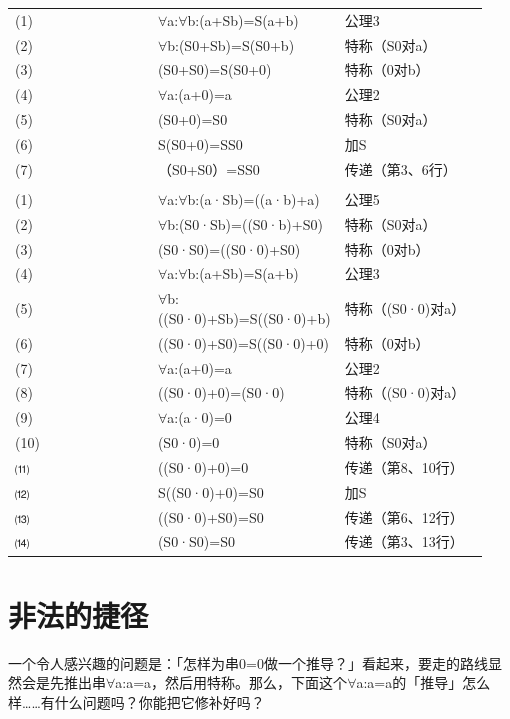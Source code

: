 \documentclass[
  12pt,
  twoside,
  openright,
  oldfontcommands,
]{memoir}
\begin{document}
\begin{longtable}[]{>{\raggedright\arraybackslash}p{0.313\linewidth} >{\raggedright\arraybackslash}p{0.313\linewidth} >{\raggedright\arraybackslash}p{0.313\linewidth}}
\toprule\noalign{}
\endhead
\bottomrule\noalign{}
\endlastfoot
(1) & $\forall$a:$\forall$b:(a+Sb)=S(a+b) & 公理3 \\
(2) & $\forall$b:(S0+Sb)=S(S0+b) & 特称（S0对a） \\
(3) & (S0+S0)=S(S0+0) & 特称（0对b） \\
(4) & $\forall$a:(a+0)=a & 公理2 \\
(5) & (S0+0)=S0 & 特称（S0对a） \\
(6) & S(S0+0)=SS0 & 加S \\
(7) & （S0+S0）=SS0 & 传递（第3、6行） \\
\multicolumn{3}{@{}l@{}}{%
*　*　*　*　*} \\
(1) & $\forall$a:$\forall$b:(a·Sb)=((a·b)+a) & 公理5 \\
(2) & $\forall$b:(S0·Sb)=((S0·b)+S0) & 特称（S0对a） \\
(3) & (S0·S0)=((S0·0)+S0) & 特称（0对b） \\
(4) & $\forall$a:$\forall$b:(a+Sb)=S(a+b) & 公理3 \\
(5) & $\forall$b:((S0·0)+Sb)=S((S0·0)+b) & 特称（(S0·0)对a） \\
(6) & ((S0·0)+S0)=S((S0·0)+0) & 特称（0对b） \\
(7) & $\forall$a:(a+0)=a & 公理2 \\
(8) & ((S0·0)+0)=(S0·0) & 特称（(S0·0)对a） \\
(9) & $\forall$a:(a·0)=0 & 公理4 \\
(10) & (S0·0)=0 & 特称（S0对a） \\
⑾ & ((S0·0)+0)=0 & 传递（第8、10行） \\
⑿ & S((S0·0)+0)=S0 & 加S \\
⒀ & ((S0·0)+S0)=S0 & 传递（第6、12行） \\
⒁ & (S0·S0)=S0 & 传递（第3、13行） \\
\end{longtable}

\section{非法的捷径}

一个令人感兴趣的问题是：「怎样为串0=0做一个推导？」看起来，要走的路线显然会是先推出串$\forall$a:a=a，然后用特称。那么，下面这个$\forall$a:a=a的「推导」怎么样\ldots\ldots 有什么问题吗？你能把它修补好吗？
\end{document}
